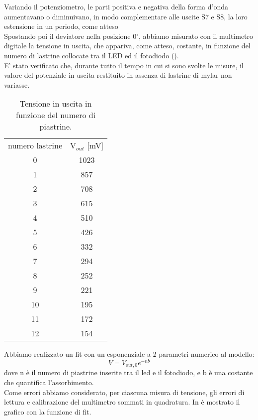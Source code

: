  Variando il potenziometro, le parti positiva e negativa della forma d'onda aumentavano o diminuivano, in modo complementare alle uscite S7 e S8, la loro estensione in un periodo, come atteso\\ Spostando poi il deviatore nella posizione 0$^\circ$, abbiamo misurato con il multimetro digitale la tensione in uscita, che appariva, come atteso, costante, in funzione del numero di lastrine collocate tra il LED ed il fotodiodo ().\\ E' stato verificato che, durante tutto il tempo in cui si sono svolte le misure, il valore del potenziale in uscita restituito in assenza di lastrine di mylar non variasse. 
\begin{table}[h]
	\centering
	\begin{tabular}{cc}		
		{numero lastrine} & {V$_{out}$ [mV]}\\
                      0 & 1023\\
                      1 & 857\\
                      2 & 708\\
                      3 & 615\\
                      4 & 510\\
                      5 & 426\\
                      6 & 332\\
                      7 & 294\\
                      8 & 252\\
                      9 & 221\\
                     10 & 195\\
                     11 & 172\\
                     12 & 154\\
	           \midrule
	
 	\end{tabular}
	\caption{Tensione in uscita in funzione del numero di piastrine. }
	\label{t:Fotodiodo}
\end{table}
Abbiamo realizzato un fit con un esponenziale a 2 parametri numerico al modello:
\begin{equation}
V=V_{out,0}e^{-nb}
\end{equation}
dove n è il numero di piastrine inserite tra il led e il fotodiodo, e b è una costante che quantifica l'assorbimento.\\
 Come errori abbiamo considerato, per ciascuna misura di tensione, gli errori di lettura e calibrazione del multimetro sommati in quadratura. In  è mostrato il grafico con la funzione di fit.\\

